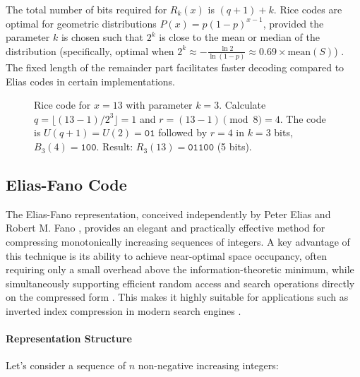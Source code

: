 \noindent The total number of bits required for $R_k(x)$ is $(q+1) + k$. Rice codes are optimal for geometric distributions $P(x) = p(1-p)^{x-1}$, provided the parameter $k$ is chosen such that $2^k$ is close to the mean or median of the distribution (specifically, optimal when $2^k \approx -\frac{\ln 2}{\ln(1-p)} \approx 0.69 \times \text{mean}(S)$) \cite{ferragina2023pearls, witten1999managing}. The fixed length of the remainder part facilitates faster decoding compared to Elias codes in certain implementations.

\begin{figure}[hbtp]
    \centering
    \caption{Rice code for $x=13$ with parameter $k=3$. Calculate $q = \lfloor (13-1) / 2^3 \rfloor = 1$ and $r = (13-1) \pmod 8 = 4$. The code is $U(q+1)=U(2)=\texttt{01}$ followed by $r=4$ in $k=3$ bits, $B_3(4)=\texttt{100}$. Result: $R_3(13)=\texttt{01100}$ (5 bits).}
    \label{fig:rice_code_example}

\end{figure}

\subsection{Elias-Fano Code}

The Elias-Fano representation, conceived independently by Peter Elias \cite{Elias1975} and Robert M. Fano \cite{Fano1971}, provides an elegant and practically effective method for compressing monotonically increasing sequences of integers. A key advantage of this technique is its ability to achieve near-optimal space occupancy, often requiring only a small overhead above the information-theoretic minimum, while simultaneously supporting efficient random access and search operations directly on the compressed form \cite{ferragina2023pearls, pibiri_et_al}. This makes it highly suitable for applications such as inverted index compression in modern search engines \cite{vigna2013quasi, EFVenturini2014}.

\paragraph{Representation Structure}
Let's consider a sequence of $n$ non-negative increasing integers:

